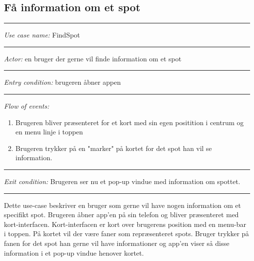 \documentclass[12pt]{article}
\begin{document}
\pagebreak
\setlength\parindent{0pt}
\subsection*{Få information om et spot}
\hrule\vspace{5mm}
\textit{Use case name:} FindSpot\\
\hrule\vspace{5mm}
\textit{Actor:} en bruger der gerne vil finde information om et spot\\
\hrule\vspace{5mm}
\textit{Entry condition:} brugeren åbner appen\\
\hrule\vspace{5mm}
\textit{Flow of events:}
\begin{enumerate}
\item Brugeren bliver præsenteret for et kort med sin egen positition i centrum og en menu linje i toppen
\item Brugeren trykker på en "marker" på kortet for det spot han vil se information.
\end{enumerate}
\hrule\vspace{5mm}
\textit{Exit condition:} Brugeren ser nu et pop-up vindue med information om spottet.\\
\hrule\vspace{5mm}
Dette use-case beskriver en bruger som gerne vil have nogen information om et specifikt spot. Brugeren åbner app'en på 
sin telefon og bliver præsenteret med kort-interfacen. Kort-interfacen er kort over brugerens position med en menu-bar 
i toppen. På kortet vil der være faner som repræsenteret spots. Bruger trykker på fanen for det spot han gerne vil have
informationer og app'en viser så disse information i et pop-up vindue henover kortet.
\newpage
\end{document}
